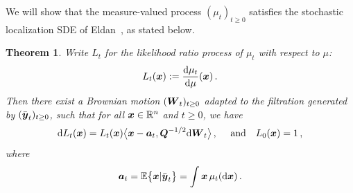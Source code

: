 \documentclass[11pt]{article}
\numberwithin{equation}{section}
\newtheorem{theorem}{Theorem}
\theoremstyle{myremark}
\theoremstyle{myremark}
\theoremstyle{myexample}
\newcommand{\R}{\mathbb{R}}
\newcommand{\1}{\mathbf{1}}
\begin{document}
We will show that the measure-valued process $(\mu_t)_{t \ge 0}$ satisfies the stochastic 
localization SDE of Eldan~\cite{eldan2020taming}, as stated below.
\begin{theorem} 
Write $L_t$ for the likelihood ratio process of $\mu_t$ with respect to $\mu$: 
\begin{equation}
L_t({\boldsymbol{x}}) := \frac{{\rm d} \mu_t}{{\rm d} \mu}({\boldsymbol{x}}) \, .
\end{equation}
Then there exist a Brownian motion $(\boldsymbol{W}_t)_{t \ge 0}$ adapted to the filtration generated by $(\bar{{\boldsymbol{y}}}_t)_{t \ge 0}$, such that for all $\bx \in \R^n$ and $t \ge 0$, we have
\begin{equation}\label{eq:SL_SDE}
{\rm d} L_t ({\boldsymbol{x}}) = L_t({\boldsymbol{x}}) \big\langle {\boldsymbol{x}} - {\boldsymbol{a}}_t , {\boldsymbol{Q}}^{-1/2} {\rm d} \boldsymbol{W}_t \big\rangle \, ,~~~~\mbox{and}~~~L_0({\boldsymbol{x}})=1 \, ,
\end{equation}
where
\begin{equation}
{\boldsymbol{a}}_t = {\mathbb E}\big\{{\boldsymbol{x}} | \bar{{\boldsymbol{y}}}_t\big\} = \int {\boldsymbol{x}} \,  \mu_t({\rm d}{\boldsymbol{x}}) \, .
\end{equation}
\end{theorem}
\end{document}
